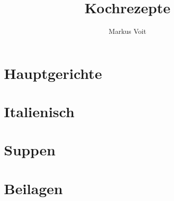 \documentclass[DIV=11, pagesize, fontsize=11pt, paper=a4, numbers=noenddot]{scrartcl}
\title{Kochrezepte}
\author{Markus Voit}
\begin{document}
\maketitle

\tableofcontents
\clearpage

\section{Hauptgerichte}
\newpage{}
\newpage{}
\newpage{}
\newpage{}
\newpage{}
\newpage{}
\newpage{}
\newpage{}
\newpage{}
\newpage{}
\newpage{}

\section{Italienisch}
\newpage{}
\newpage{}
\newpage{}

\newpage{}
\newpage{}
\newpage{}
\newpage{}
\newpage{}

\newpage{}

\newpage{}

\section{Suppen}
\newpage{}
\newpage{}

\section{Beilagen}
\newpage{}
\newpage{}
\newpage{}
\newpage{}
\newpage{}
\end{document}
